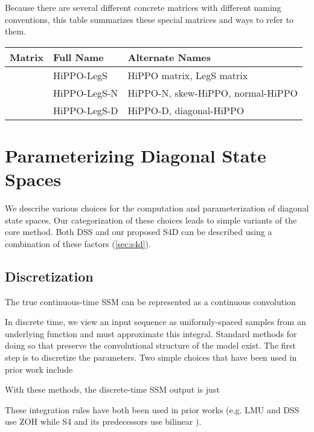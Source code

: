 \documentclass{article}
\begin{document}
Because there are several different concrete matrices with different naming conventions, this table summarizes these special matrices and ways to refer to them.
\begin{center}
  \small
  \centering
  \begin{tabular}{@{}lll@{}}
    \toprule
    Matrix & Full Name & Alternate Names \\
    \midrule
     & HiPPO-LegS & HiPPO matrix, LegS matrix \\
     & HiPPO-LegS-N & HiPPO-N, skew-HiPPO, normal-HiPPO \\
     & HiPPO-LegS-D & HiPPO-D, diagonal-HiPPO \\
    \bottomrule
  \end{tabular}
\end{center}


 

\section{Parameterizing Diagonal State Spaces}
\label{sec:method}


We describe various choices for the computation and parameterization of diagonal state spaces.
Our categorization of these choices leads to simple variants of the core method.
Both DSS and our proposed S4D can be described using a combination of these factors (\cref{sec:s4d}).

\subsection{Discretization}
\label{sec:method:disc}

The true continuous-time SSM can be represented as a continuous convolution


In discrete time, we view an input sequence  as uniformly-spaced samples from an underlying function  and must approximate this integral.
Standard methods for doing so that preserve the convolutional structure of the model exist.
The first step is to discretize the parameters.
Two simple choices that have been used in prior work include 

With these methods, the discrete-time SSM output is just


These integration rules have both been used in prior works (e.g. LMU and DSS use ZOH \citep{voelker2019legendre,gupta2022diagonal} while S4 and its predecessors use bilinear \citep{gu2020hippo,gu2021lssl,gu2022efficiently}).
\end{document}

